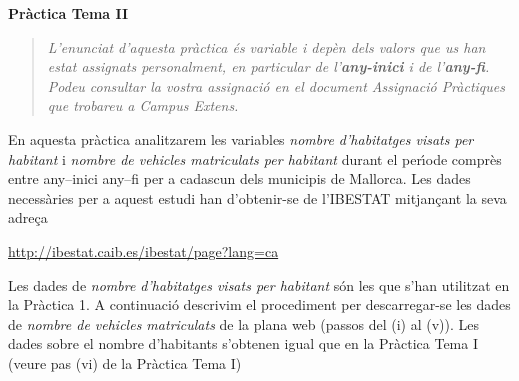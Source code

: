 \documentclass[11pt]{article}
\begin{document}
\vspace{0.3cm}
\noindent
\textbf{Pr\`actica Tema II}

\vspace{0.3cm}


\begin{quotation}
\textit{L'enunciat d'aquesta pr\`actica \'es variable i dep\`en dels valors que us han estat assignats personalment, en particular de l'\textbf{any-inici} i
de l'\textbf{any-fi}. Podeu consultar la vostra assignaci\'o en el document \textit{Assignaci\'o Pr\`actiques} que trobareu a Campus Extens.}
\end{quotation}

En aquesta pr\`actica analitzarem les variables \textit{nombre d'habitatges visats per habitant} i \textit{nombre de vehicles matriculats per habitant} durant el per\'{\i}ode compr\`es entre any--inici any--fi per a cadascun dels municipis de Mallorca. Les dades necess\`aries per a aquest estudi han d'obtenir-se de l'IBESTAT mitjan\c{c}ant la seva adre\c{c}a 
\begin{center}
\url{http://ibestat.caib.es/ibestat/page?lang=ca}
\end{center}
Les dades de \textit{nombre d'habitatges visats per habitant} s\'on les que s'han utilitzat en la Pr\`actica 1. 
A continuaci\'o descrivim el procediment per descarregar-se les dades de \textit{nombre de vehicles matriculats} de la plana web (passos del (i) 
al (v)). Les dades sobre el nombre d'habitants s'obtenen igual que en la Pr\`actica Tema I (veure pas (vi) de la Pr\`actica Tema I) 
\end{document}
